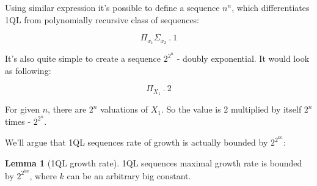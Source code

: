 \documentclass[12pt]{article}
\theoremstyle{definition}
\newtheorem{lemma}[theorem]{Lemma}
\begin{document}
Using similar expression it's possible to define a sequence $n^n$, which differentiates 1QL from polynomially recursive class of sequences:

$$\Pi_{x_1}\Sigma_{x_2} \ . \ 1$$

It's also quite simple to create a sequence $2^{2^n}$ - doubly exponential. It would look as following:

$$\Pi_{X_1} \ . \ 2$$

For given $n$, there are $2^n$ valuations of $X_1$. So the value is $2$ multiplied by itself $2^n$ times - $2^{2^n}$.

We'll argue that 1QL sequences rate of growth is actually bounded by $2^{2^{kn}}$:

\begin{lemma}[1QL growth rate]
1QL sequences maximal growth rate is bounded by $2^{2^{kn}}$, where $k$ can be an arbitrary big constant.
\end{lemma}
\end{document}
